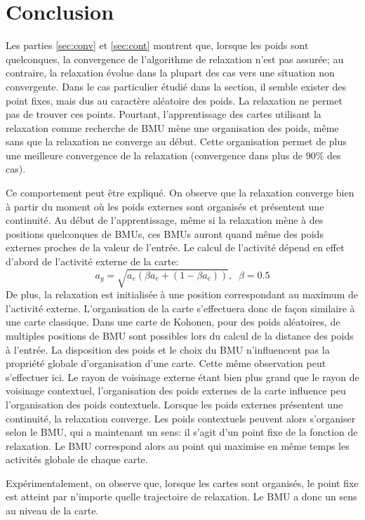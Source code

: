 \documentclass[../main]{subfiles}
\begin{document}
\section{Conclusion}

Les parties \ref{sec:conv} et \ref{sec:cont} montrent que, lorsque les poids sont quelconques, la convergence de l'algorithme de relaxation n'est pas assurée; au contraire, la relaxation évolue dans la plupart des cas vers une situation non convergente. Dans le cas particulier étudié dans la section, il semble exister des point fixes, mais dus au caractère aléatoire des poids. La relaxation ne permet pas de trouver ces points. Pourtant, l'apprentissage des cartes utilisant la relaxation comme recherche de BMU mène une organisation des poids, même sans que la relaxation ne converge au début. Cette organisation permet de plus une meilleure convergence de la relaxation (convergence dans plus de $90 \%$ des cas).

Ce comportement peut être expliqué. On observe que la relaxation converge bien à partir du moment où les poids externes sont organisés et présentent une continuité. Au début de l'apprentissage, même si la relaxation mène à des positions quelconques de BMUs, ces BMUs auront quand même des poids externes proches de la valeur de l'entrée. Le calcul de l'activité dépend en effet d'abord de l'activité externe de la carte:
$$ a_g = \sqrt{a_e ( \beta a_e + (1-\beta a_c))}, \;\; \beta=0.5$$ 
De plus, la relaxation est initialisée à une position correspondant au maximum de l'activité externe.
L'organisation de la carte s'effectuera donc de façon similaire à une carte classique. Dans une carte de Kohonen, pour des poids aléatoires, de multiples positions de BMU sont possibles lors du calcul de la distance des poids à l'entrée. La disposition des poids et le choix du BMU n'influencent pas la propriété globale d'organisation d'une carte. Cette même observation peut s'effectuer ici. 
Le rayon de voisinage externe étant bien plus grand que le rayon de voisinage contextuel, l'organisation des poids externes de la carte influence peu l'organisation des poids contextuels.
Lorsque les poids externes présentent une continuité, la relaxation converge. Les poids contextuels peuvent alors s'organiser selon le BMU, qui a maintenant un sens: il s'agit d'un point fixe de la fonction de relaxation. Le BMU correspond alors au point qui maximise en même temps les activités globale de chaque carte.

Expérimentalement, on observe que, lorsque les cartes sont organisés, le point fixe est atteint par n'importe quelle trajectoire de relaxation. Le BMU a donc un sens au niveau de la carte. 
\end{document}
